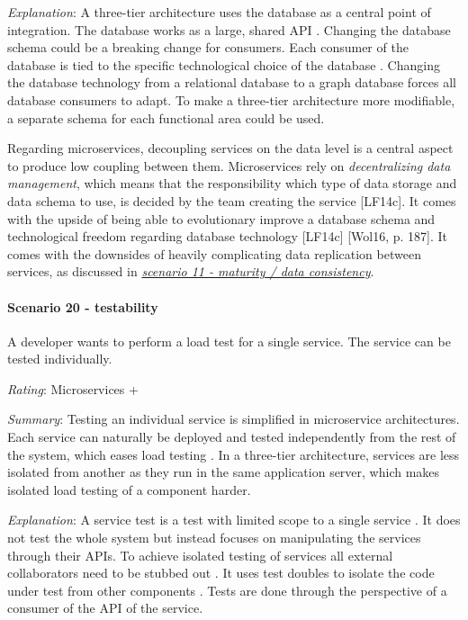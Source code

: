 \textit{Explanation}:
A three-tier architecture uses the database as a central point of integration.
The database works as a large, shared API \cite[p. 41]{Newman2015}.
Changing the database schema could be a breaking change for consumers.
Each consumer of the database is tied to the specific technological choice of the database \cite[p. 41]{Newman2015}.
Changing the database technology from a relational database to a graph database forces all database consumers to adapt.
To make a three-tier architecture more modifiable, a separate schema for each functional area could be used.

Regarding microservices, decoupling services on the data level is a central aspect to produce low coupling between them.
Microservices rely on \textit{decentralizing data management}, which means that the responsibility which type of data storage and data schema to use, is decided by the team creating the service [LF14c].
It comes with the upside of being able to evolutionary improve a database schema and technological freedom regarding database technology [LF14c] [Wol16, p. 187].
It comes with the downsides of heavily complicating data replication between services, as discussed in \textit{\hyperref[quaMicro:s11]{scenario 11 - maturity / data consistency}}.

\paragraph{Scenario 20 - testability}
A developer wants to perform a load test for a single service. The service can be tested individually.
\label{quaMicro:s20}

\textit{Rating}: Microservices +

\textit{Summary}:
Testing an individual service is simplified in microservice architectures.
Each service can naturally be deployed and tested independently from the rest of the system, which eases load testing \citep[p. 16f.]{Clemson2014}.
In a three-tier architecture, services are less isolated from another as they run in the same application server, which makes isolated load testing of a component harder.

\textit{Explanation}:
A service test is a test with limited scope to a single service \cite{FowlerComponent2013}. 
It does not test the whole system but instead focuses on manipulating the services through their \ac{API}s.
To achieve isolated testing of services all external collaborators need to be stubbed out \citep[p. 134, 137]{Newman2015}.
It uses test doubles to isolate the code under test from other components \citep[p. 16f.]{Clemson2014}.
Tests are done through the perspective of a consumer of the \ac{API} of the service.

